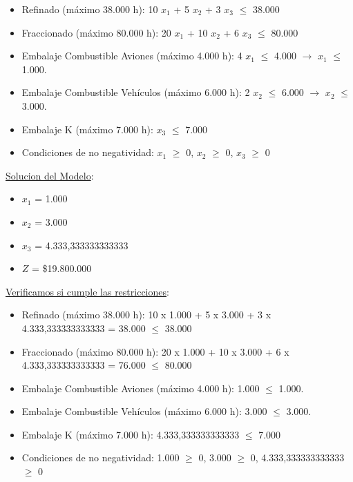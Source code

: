 \documentclass[10pt,a4paper]{article}
\begin{document}
\begin{enumerate}
\begin{itemize}
        \item Refinado (máximo 38.000 h): 10 $x_{1}$ + 5 $x_{2}$ + 3 $x_{3}$ $\leq$ 38.000
        \item Fraccionado (máximo 80.000 h): 20 $x_{1}$ + 10 $x_{2}$ + 6 $x_{3}$ $\leq$ 80.000
        \item Embalaje Combustible Aviones (máximo 4.000 h): 4 $x_{1}$ $\leq$ 4.000 $\rightarrow$ $x_{1}$ $\leq$ 1.000.
        \item Embalaje Combustible Vehículos (máximo 6.000 h): 2 $x_{2}$ $\leq$ 6.000 $\rightarrow$ $x_{2}$ $\leq$ 3.000.
        \item Embalaje K (máximo 7.000 h): $x_{3}$ $\leq$ 7.000
        \item Condiciones de no negatividad: $x_{1}$ $\geq$ 0, $x_{2}$ $\geq$ 0, $x_{3}$ $\geq$ 0\\

    \end{itemize}

    \clearpage

    \underline{Solucion del Modelo}: 

    \begin{itemize}

        \item $x_{1}$ = 1.000
        \item $x_{2}$ = 3.000
        \item $x_{3}$ = 4.333,333333333333
        \item $Z$ = \$19.800.000\\

    \end{itemize}

    \underline{Verificamos si cumple las restricciones}:

    \begin{itemize}

        \item Refinado (máximo 38.000 h): 10 x 1.000 + 5 x 3.000 + 3 x 4.333,333333333333 = 38.000 $\leq$ 38.000
        \item Fraccionado (máximo 80.000 h): 20 x 1.000 + 10 x 3.000 + 6 x 4.333,333333333333 = 76.000 $\leq$ 80.000
        \item Embalaje Combustible Aviones (máximo 4.000 h): 1.000 $\leq$ 1.000.
        \item Embalaje Combustible Vehículos (máximo 6.000 h): 3.000 $\leq$ 3.000.
        \item Embalaje K (máximo 7.000 h): 4.333,333333333333 $\leq$ 7.000
        \item Condiciones de no negatividad: 1.000 $\geq$ 0, 3.000 $\geq$ 0, 4.333,333333333333 $\geq$ 0 \\


\end{itemize}
\end{enumerate}
\end{document}
